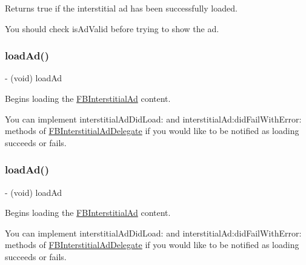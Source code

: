 Returns true if the interstitial ad has been successfully loaded.

You should check {\ttfamily is\+Ad\+Valid} before trying to show the ad. \mbox{\label{interfaceFBInterstitialAd_a4bbd516a1c5f381ab7af76c2e113fd86}} 
\subsubsection{\texorpdfstring{load\+Ad()}{loadAd()}\hspace{0.1cm}{\footnotesize\ttfamily [1/5]}}
{\footnotesize\ttfamily -\/ (void) load\+Ad \begin{DoxyParamCaption}{ }\end{DoxyParamCaption}}

Begins loading the \hyperlink{interfaceFBInterstitialAd}{F\+B\+Interstitial\+Ad} content.

You can implement {\ttfamily interstitial\+Ad\+Did\+Load\+:} and {\ttfamily interstitial\+Ad\+:did\+Fail\+With\+Error\+:} methods of {\ttfamily \hyperlink{classFBInterstitialAdDelegate-p}{F\+B\+Interstitial\+Ad\+Delegate}} if you would like to be notified as loading succeeds or fails. \mbox{\label{interfaceFBInterstitialAd_a4bbd516a1c5f381ab7af76c2e113fd86}} 
\subsubsection{\texorpdfstring{load\+Ad()}{loadAd()}\hspace{0.1cm}{\footnotesize\ttfamily [2/5]}}
{\footnotesize\ttfamily -\/ (void) load\+Ad \begin{DoxyParamCaption}{ }\end{DoxyParamCaption}}

Begins loading the \hyperlink{interfaceFBInterstitialAd}{F\+B\+Interstitial\+Ad} content.

You can implement {\ttfamily interstitial\+Ad\+Did\+Load\+:} and {\ttfamily interstitial\+Ad\+:did\+Fail\+With\+Error\+:} methods of {\ttfamily \hyperlink{classFBInterstitialAdDelegate-p}{F\+B\+Interstitial\+Ad\+Delegate}} if you would like to be notified as loading succeeds or fails. \mbox{\label{interfaceFBInterstitialAd_a4bbd516a1c5f381ab7af76c2e113fd86}} 
